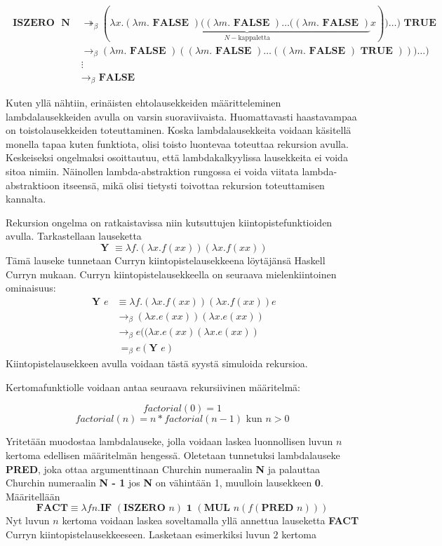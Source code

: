 \begin{align*}
\textbf{ ISZERO } \textbf{ N } &\twoheadrightarrow_{\beta} (\lambda x . \underbrace{ (\lambda m . \textbf{ FALSE }) ( (\lambda m . \textbf{ FALSE }) \ldots ((\lambda m . \textbf{ FALSE }) }_{ N-\text{kappaletta}} x)) \ldots ) \textbf{ TRUE } \\
&\rightarrow_{\beta}  (\lambda m . \textbf{ FALSE }) ( (\lambda m . \textbf{ FALSE }) \ldots ((\lambda m . \textbf{ FALSE }) \textbf{ TRUE }) )) \ldots ) \\
&\vdots \\
&\rightarrow_{\beta} \textbf{ FALSE }
\end{align*}
\par
Kuten yllä nähtiin, erinäisten ehtolausekkeiden määritteleminen lambdalausekkeiden avulla on varsin suoraviivaista. Huomattavasti haastavampaa on toistolausekkeiden toteuttaminen. Koska lambdalausekkeita voidaan käsitellä monella tapaa kuten funktiota, olisi toisto luontevaa toteuttaa rekursion avulla. Keskeiseksi ongelmaksi osoittautuu, että lambdakalkyylissa lausekkeita ei voida sitoa nimiin. Näinollen lambda-abstraktion rungossa ei voida viitata lambda-abstraktioon itseensä, mikä olisi tietysti toivottaa rekursion toteuttamisen kannalta. 
\par 
Rekursion ongelma on ratkaistavissa niin kutsuttujen kiintopistefunktioiden avulla. Tarkastellaan lauseketta 
\[ \textbf{ Y } \equiv \lambda f . (\lambda x . f(xx)) (\lambda x . f(xx)) \]
Tämä lauseke tunnetaan Curryn kiintopistelausekkeena löytäjänsä Haskell Curryn mukaan. Curryn kiintopistelausekkeella on seuraava mielenkiintoinen ominaisuus:
\begin{align*}
\textbf{ Y } e &\equiv \lambda f . (\lambda x . f(xx)) (\lambda x . f(xx)) e \\
&\rightarrow_{\beta} (\lambda x . e(xx)) (\lambda x . e(xx)) \\
&\rightarrow_{\beta} e((\lambda x . e(xx)(\lambda x . e(xx)) \\
&\ =_{\beta} e(\textbf{Y }e) 
\end{align*}
Kiintopistelausekkeen avulla voidaan tästä syystä simuloida rekursioa.

Kertomafunktiolle voidaan antaa seuraava rekursiivinen määritelmä:

\[factorial(0) = 1 \]
\[factorial(n) = n * factorial(n-1) \text{ kun } n > 0\]

Yritetään muodostaa lambdalauseke, jolla voidaan laskea luonnollisen luvun $n$ kertoma edellisen määritelmän hengessä. Oletetaan tunnetuksi lambdalauseke \textbf{PRED}, joka ottaa argumenttinaan Churchin numeraalin \textbf{N} ja palauttaa Churchin numeraalin \textbf{N - 1} jos \textbf{N} on vähintään 1, muulloin lausekkeen \textbf{0}. Määritellään
\[ \textbf{FACT} \equiv \lambda f n. \textbf{IF } (\textbf{ISZERO } n) \textbf{ 1 } (\textbf{MUL } n (f (\textbf{PRED } n))) \]
Nyt luvun $n$ kertoma voidaan laskea soveltamalla yllä annettua lauseketta \textbf{FACT} Curryn kiintopistelausekkeeseen. Lasketaan esimerkiksi luvun $2$ kertoma

